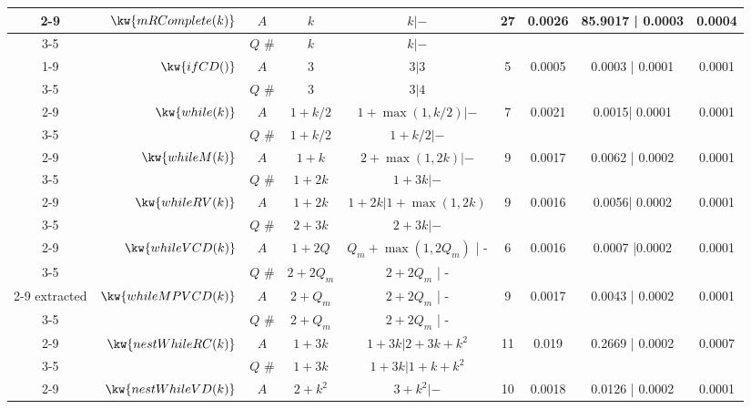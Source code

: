 \begin {table}[H]
\begin{center}
{\begin{tabular}{ >{\tiny}c| r | >{\tiny}c | c | c | c | c | c | c  }
         \cline{2-9}
         & $\kw{mRComplete(k)}$ 
         & $A$ & $k$ & $ k | -  $   &  27 & 0.0026 & 85.9017 | 0.0003 & 0.0004 \\
         \cline{3-5}
         & & $Q$ \#   & $k$ & $k |-$   & & & & \\
         \cline{1-9}
         & $ \kw{ifCD()}$ 
         & $A$ & $3$ & $3 | 3$  & 5 & 0.0005 & 0.0003 | 0.0001  & 0.0001 \\
         \cline{3-5}
         & & $Q$ \#   & 3  &   $3| 4$ & & & & \\
         \cline{2-9}
         & $  \kw{while(k)}$ 
         & $A$ & $1+k/2$ & $1 +\max(1, k/2) |- $  & 7 & 0.0021 & 0.0015| 0.0001 &  0.0001 \\
         \cline{3-5}
         & & $Q$ \#   &  $1+k/2$ &  $1+k/2 | - $  & & & & \\
         \cline{2-9}
         & $  \kw{whileM(k)}$ 
         & $A$ &  $1 + k$  & $ 2 + \max(1,2k) | -$  &  9 & 0.0017 & 0.0062 | 0.0002 & 0.0001  \\
         \cline{3-5}
         & & $Q$ \#   & $1+2k $ & $1 + 3k | -$  & & & & \\
         \cline{2-9}
         & $  \kw{whileRV(k)}$ 
         & $A$ & $1 + 2k$ &  $1 + 2k| 1 + \max(1,2k)$  &  9 & 0.0016 & 0.0056| 0.0002 & 0.0001  \\
         \cline{3-5}
         & & $Q$ \#   & {$2 + 3 k$} & $2 + 3 k| -$   & & & & \\
         \cline{2-9}
         &  ${\kw{whileVCD(k)}} $ 
         & $A$ & ${1 + 2Q}$ &  ${Q_m+\max(1,2Q_m)}$ | - &  6 & 0.0016 & 0.0007 |0.0002 & 0.0001 \\
         \cline{3-5}
         & & $Q$ \#   &{$2+2Q_m$} & $2+2Q_m$ | -   & & & & \\
         \cline{2-9}
         extracted
         & $ {\kw{whileMPVCD(k)}}$ 
         & $A$ &  $2 + Q_m$ & $2+2Q_m$ | -  &   9 & 0.0017 & 0.0043 | 0.0002 & 0.0001 \\
         \cline{3-5}
         & & $Q$ \#   & $2+Q_m$ & $2+2Q_m$ | - & & & & \\
         \cline{2-9}
         & $\kw{nestWhileRC(k)}$ 
         & $A$ & $1 + 3k$ &  $1 + 3k | 2 + 3k + k^2$   &  11 & 0.019 & 0.2669 | 0.0002 & 0.0007 \\
         \cline{3-5}
         & & $Q$ \#   & $1 + 3k$ &  $1 + 3k | 1 + k + k^2$ & & & & \\
         \cline{2-9}
         & $\kw{nestWhileVD(k)}$ 
         & $A$ & $2 + k^2$ &   $3 + k^2| -$    &  10 & 0.0018 & 0.0126 | 0.0002 & 0.0001  \\

\end{tabular}}
\end{center}
\end{table}
